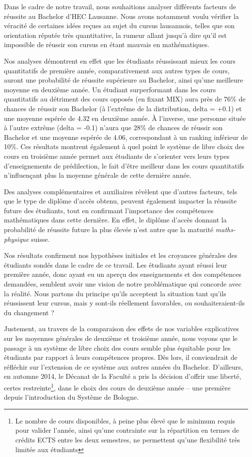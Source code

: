 
Dans le cadre de notre travail, nous souhaitions analyser différents facteurs de réussite au Bachelor d'HEC Lausanne. Nous avons notamment voulu vérifier la véracité de certaines idées reçues au sujet du cursus lausannois, telles que son orientation réputée très quantitative, la rumeur allant jusqu'à dire qu'il est impossible de réussir son cursus en étant mauvais en mathématiques.

Nos analyses démontrent en effet que les étudiants réussissant mieux les cours quantitatifs de première année, comparativement aux autres types de cours, auront une probabilité de réussite supérieure au Bachelor, ainsi qu'une meilleure moyenne en deuxième année. Un étudiant surperformant dans les cours quantitatifs au détriment des cours opposés (en fixant MIX) aura près de 76\% de chances de réussir son Bachelor (à l'extrême de la distribution, delta = +0.1) et une moyenne espérée de 4.32 en deuxième année. À l'inverse, une personne située à l'autre extrême (delta = -0.1) n'aura que 28\% de chances de réussir son Bachelor et une moyenne espérée de 4.06, correspondant à un ranking inférieur de 10\%. Ces résultats montrent également à quel point le système de libre choix des cours en troisième année permet aux étudiants de s'orienter vers leurs types d'enseignements de prédilection, le fait d'être meilleur dans les cours quantitatifs n'influençant plus la moyenne générale de cette dernière année.

Des analyses complémentaires et auxiliaires révèlent que d'autres facteurs, tels que le type de diplôme d'accès obtenu, peuvent également impacter la réussite future des étudiants, tout en confirmant l'importance des compétences mathématiques dans cette dernière. En effet, le diplôme d'accès donnant la probabilité de réussite future la plus élevée n'est autre que la maturité \textit{maths-physique} suisse.

Nos résultats confirment nos hypothèses initiales et les croyances générales des étudiants sondés dans le cadre de ce travail. Les étudiants ayant réussi leur première année, donc ayant eu un aperçu des enseignements et des compétences demandées, semblent avoir une vision de notre problématique qui concorde avec la réalité. Nous partons du principe qu'ils acceptent la situation tant qu’ils réussissent leur cursus, mais y sont-ils réellement favorables, ou souhaiteraient-ils du changement ?

Justement, au travers de la comparaison des effets de nos variables explicatives sur les moyennes générales de deuxième et troisième année, nous voyons que le passage à un système de libre choix des cours semble plus équitable pour les étudiants par rapport à leurs compétences propres. Dès lors, il conviendrait de réfléchir sur l’extension de ce système aux autres années du Bachelor. D’ailleurs, en automne 2014, le Décanat de la Faculté a pris la décision d’offrir une liberté, certes restreinte\footnote{Le nombre de cours disponibles, à peine plus élevé que le minimum requis pour valider l'année, ainsi qu'une contrainte sur la répartition en termes de crédits ECTS entre les deux semestres, ne permettent qu'une flexibilité très limitée aux étudiants}, dans le choix des cours de deuxième année – une première depuis l'introduction du Système de Bologne.

